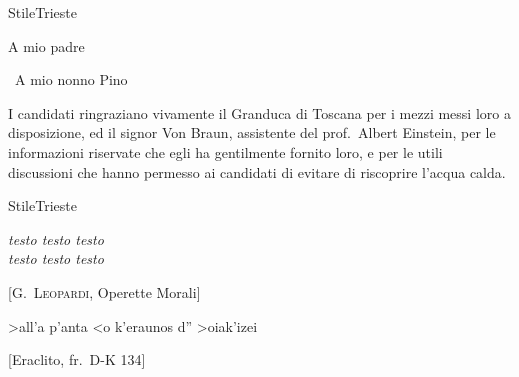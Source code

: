 \documentclass[12pt,twoside,cucitura]{toptesi}
\begin{document}

\expandafter\ifx\csname StileTrieste\endcsname\relax
    \frontespizio
\else
    \paginavuota
    \begin{dedica}
        A mio padre

        \textdagger\ A mio nonno Pino
    \end{dedica}
    \tomo
\fi

\ringraziamenti

I candidati ringraziano vivamente il Granduca di Toscana per i mezzi
messi loro a disposizione, ed il signor Von Braun, assistente del
prof.~Albert Einstein, per le informazioni riservate che egli ha
gentilmente fornito loro, e per le utili discussioni che hanno permesso
ai candidati di evitare di riscoprire l'acqua calda.

\indici

\expandafter\ifx\csname StileTrieste\endcsname\relax
\else
    \begin{citazioni}
        \textit{testo testo testo\\testo testo testo}

        [\textsc{G.\ Leopardi}, Operette Morali]

        \textgreek{>all'a p'anta <o k'eraunos d'' >oiak'izei}

        [Eraclito, fr.\ D-K 134]
    \end{citazioni}

\fi

\mainmatter
\end{document}
